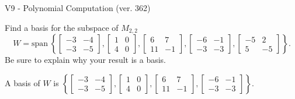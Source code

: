 \begin{exercise}
  \begin{exerciseTitle}V9 - Polynomial Computation (ver. 362)\end{exerciseTitle}
  \begin{exerciseStatement}
    Find a basis for the subspace of \(M_{2,2}\) 
\[W=\mathrm{span}\ \left\{\left[\begin{array}{cc}
-3 & -4 \\
-3 & -5
\end{array}\right] , \left[\begin{array}{cc}
1 & 0 \\
4 & 0
\end{array}\right] , \left[\begin{array}{cc}
6 & 7 \\
11 & -1
\end{array}\right] , \left[\begin{array}{cc}
-6 & -1 \\
-3 & -3
\end{array}\right] , \left[\begin{array}{cc}
-5 & 2 \\
5 & -5
\end{array}\right]\right\}.\]
 Be sure to explain why your result is a basis.


  \end{exerciseStatement}
  \begin{exerciseAnswer}
   A basis of \(W\) is  \(\left\{\left[\begin{array}{cc}
-3 & -4 \\
-3 & -5
\end{array}\right] , \left[\begin{array}{cc}
1 & 0 \\
4 & 0
\end{array}\right] , \left[\begin{array}{cc}
6 & 7 \\
11 & -1
\end{array}\right] , \left[\begin{array}{cc}
-6 & -1 \\
-3 & -3
\end{array}\right]\right\}\).
  


  \end{exerciseAnswer}
\end{exercise}